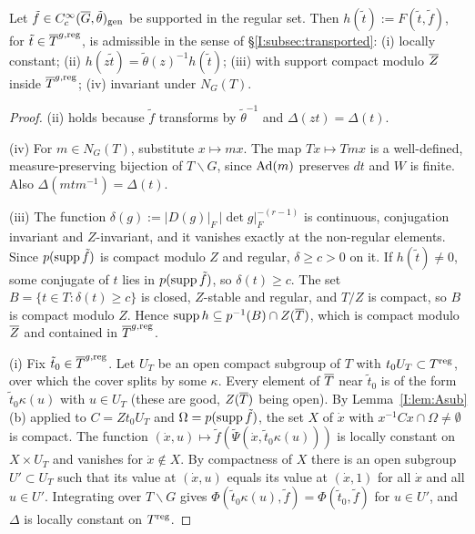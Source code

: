 \begin{lemma}\label{I:lem:Aprops}
Let $\tilde f\in C_c^\infty(\overline{G},\tilde\theta)_{\mathrm{gen}}$ be supported in the regular set. Then $h(\tilde t):=F(\tilde t,\tilde f)$, for $\tilde t\in\overline{T}^{g,\mathrm{reg}}$, is admissible in the sense of \S\ref{I:subsec:transported}: (i) locally constant; (ii) $h(z\tilde t)=\tilde\theta(z)^{-1}h(\tilde t)$; (iii) with support compact modulo $\overline{Z}$ inside $\overline{T}^{g,\mathrm{reg}}$; (iv) invariant under $N_G(T)$.
\end{lemma}
\begin{proof}
(ii) holds because $\tilde f$ transforms by $\tilde\theta^{-1}$ and $\Delta(zt)=\Delta(t)$.

(iv) For $m\in N_G(T)$, substitute $x\mapsto mx$. The map $Tx\mapsto Tmx$ is a well-defined, measure-preserving bijection of $T\backslash G$, since $\operatorname{Ad}(m)$ preserves $dt$ and $W$ is finite. Also $\Delta(mtm^{-1})=\Delta(t)$.

(iii) The function $\delta(g):=|D(g)|_F\,|\det g|_F^{-(r-1)}$ is continuous, conjugation invariant and $Z$-invariant, and it vanishes exactly at the non-regular elements. Since $p(\operatorname{supp}\tilde f)$ is compact modulo $Z$ and regular, $\delta\ge c>0$ on it. If $h(\tilde t)\ne0$, some conjugate of $t$ lies in $p(\operatorname{supp}\tilde f)$, so $\delta(t)\ge c$. The set $B=\{t\in T:\delta(t)\ge c\}$ is closed, $Z$-stable and regular, and $T/Z$ is compact, so $B$ is compact modulo $Z$. Hence $\operatorname{supp} h\subseteq p^{-1}(B)\cap Z(\overline{T})$, which is compact modulo $\overline{Z}$ and contained in $\overline{T}^{g,\mathrm{reg}}$.

(i) Fix $\tilde t_0\in\overline{T}^{g,\mathrm{reg}}$. Let $U_T$ be an open compact subgroup of $T$ with $t_0U_T\subset T^{\mathrm{reg}}$, over which the cover splits by some $\kappa$. Every element of $\overline{T}$ near $\tilde t_0$ is of the form $\tilde t_0\kappa(u)$ with $u\in U_T$ (these are good, $Z(\overline{T})$ being open). By Lemma~\ref{I:lem:Asub}(b) applied to $C=Zt_0U_T$ and $\Omega=p(\operatorname{supp}\tilde f)$, the set $X$ of $\dot x$ with $x^{-1}Cx\cap\Omega\ne\emptyset$ is compact. The function $(\dot x,u)\mapsto\tilde f(\tilde\Psi(\dot x,\tilde t_0\kappa(u)))$ is locally constant on $X\times U_T$ and vanishes for $\dot x\notin X$. By compactness of $X$ there is an open subgroup $U'\subset U_T$ such that its value at $(\dot x,u)$ equals its value at $(\dot x,1)$ for all $\dot x$ and all $u\in U'$. Integrating over $T\backslash G$ gives $\Phi(\tilde t_0\kappa(u),\tilde f)=\Phi(\tilde t_0,\tilde f)$ for $u\in U'$, and $\Delta$ is locally constant on $T^{\mathrm{reg}}$.
\end{proof}

